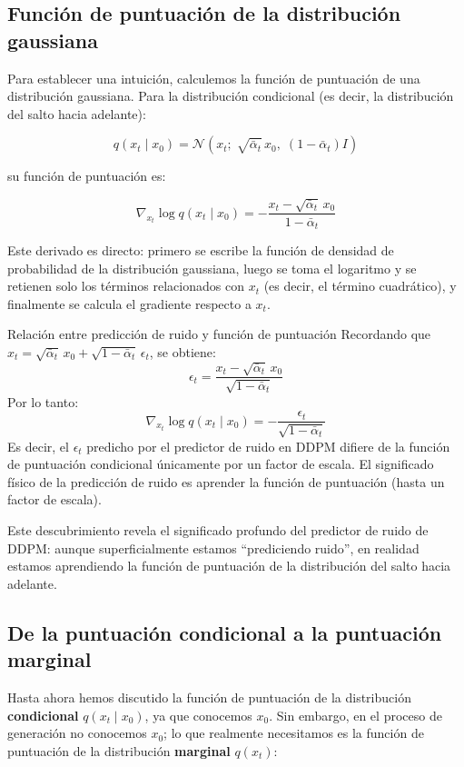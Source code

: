\subsection{Función de puntuación de la distribución gaussiana}

Para establecer una intuición, calculemos la función de puntuación de una distribución gaussiana. Para la distribución condicional (es decir, la distribución del salto hacia adelante):

$$q(x_t \mid x_0) = \mathcal{N}(x_t;\; \sqrt{\bar{\alpha}_t}\, x_0,\; (1-\bar{\alpha}_t) I)$$

su función de puntuación es:

$$\nabla_{x_t} \log q(x_t \mid x_0) = -\frac{x_t - \sqrt{\bar{\alpha}_t}\, x_0}{1-\bar{\alpha}_t}$$

Este derivado es directo: primero se escribe la función de densidad de probabilidad de la distribución gaussiana, luego se toma el logaritmo y se retienen solo los términos relacionados con $x_t$ (es decir, el término cuadrático), y finalmente se calcula el gradiente respecto a $x_t$.

\begin{importantbox}{Relación entre predicción de ruido y función de puntuación}
Recordando que $x_t = \sqrt{\bar{\alpha}_t}\, x_0 + \sqrt{1-\bar{\alpha}_t}\, \epsilon_t$, se obtiene:
$$\epsilon_t = \frac{x_t - \sqrt{\bar{\alpha}_t}\, x_0}{\sqrt{1-\bar{\alpha}_t}}$$
Por lo tanto:
$$\nabla_{x_t} \log q(x_t \mid x_0) = -\frac{\epsilon_t}{\sqrt{1-\bar{\alpha}_t}}$$
Es decir, el $\epsilon_t$ predicho por el predictor de ruido en DDPM difiere de la función de puntuación condicional únicamente por un factor de escala. El significado físico de la predicción de ruido es aprender la función de puntuación (hasta un factor de escala).
\end{importantbox}

Este descubrimiento revela el significado profundo del predictor de ruido de DDPM: aunque superficialmente estamos ``prediciendo ruido'', en realidad estamos aprendiendo la función de puntuación de la distribución del salto hacia adelante.

\subsection{De la puntuación condicional a la puntuación marginal}

Hasta ahora hemos discutido la función de puntuación de la distribución \textbf{condicional} $q(x_t \mid x_0)$, ya que conocemos $x_0$. Sin embargo, en el proceso de generación no conocemos $x_0$; lo que realmente necesitamos es la función de puntuación de la distribución \textbf{marginal} $q(x_t)$:

